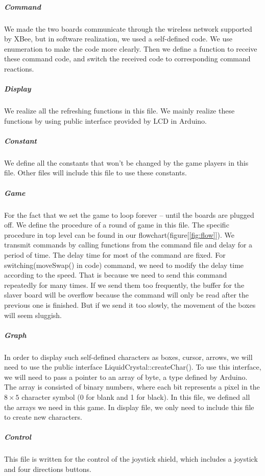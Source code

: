 \subparagraph{Command}
\hfill \newline
We made the two boards communicate through the wireless network supported by XBee, but in software realization, we used a self-defined code. We use enumeration to make the code more clearly. Then we define a function to receive these command code, and switch the received code to corresponding command reactions.

\subparagraph{Display}
\hfill \newline
We realize all the refreshing functions in this file. We mainly realize these functions by using public interface provided by LCD in Arduino.

\subparagraph{Constant}
\hfill \newline
We define all the constants that won't be changed by the game players in this file. Other files will include this file to use these constants.

\subparagraph{Game}
\hfill \newline
For the fact that we set the game to loop forever -- until the boards are plugged off. We define the procedure of a round of game in this file. The specific procedure in top level can be found in our flowchart(figure[\ref{fig:flow}]). We transmit commands by calling functions from the command file and delay for a period of time. The delay time for most of the command are fixed. For switching(moveSwap() in code) command, we need to modify the delay time according to the speed. That is because we need to send this command repeatedly for many times. If we send them too frequently, the buffer for the slaver board will be overflow because the command will only be read after the previous one is finished. But if we send it too slowly, the movement of the boxes will seem sluggish.

\subparagraph{Graph}
\hfill \newline
In order to display such self-defined characters as boxes, cursor, arrows, we will need to use the public interface LiquidCrystal::createChar(). To use this interface, we will need to pass a pointer to an array of byte, a type defined by Arduino. The array is consisted of binary numbers, where each bit represents a pixel in the $ 8\times 5 $ character symbol (0 for blank and 1 for black). In this file, we defined all the arrays we need in this game. In display file, we only need to include this file to create new characters.

\subparagraph{Control}
\hfill \newline
This file is written for the control of the joystick shield, which includes a joystick and four directions buttons.

